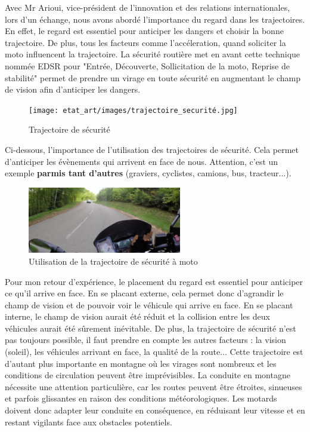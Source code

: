 Avec Mr Arioui, vice-président de l'innovation et des relations internationales, lors d'un échange, nous avons abordé l'importance du regard dans les trajectoires. En effet, le regard est essentiel pour anticiper les dangers et choisir la bonne trajectoire. De plus, tous les facteurs comme l'accéleration, quand soliciter la moto influencent la trajectoire. 
La sécurité routière\cite{trajectoire_securite} met en avant cette technique nommée EDSR pour "Entrée, Découverte, Sollicitation de la moto, Reprise de stabilité" permet de prendre un virage en toute sécurité en augmentant le champ de vision afin d'anticiper les dangers. 
\begin{figure}[H]
    \centering
    \texttt{[image: etat\_art/images/trajectoire\_securité.jpg]} 
    \caption{Trajectoire de sécurité}
\end{figure}
Ci-dessous, l'importance de l'utilisation des trajectoires de sécurité. Cela permet d'anticiper les évènements qui arrivent en face de nous. Attention, c'est un exemple \textbf{parmis tant d'autres} (graviers, cyclistes, camions, bus, tracteur...).
\begin{figure}[H]
    \centering
    \includegraphics[width=0.6\textwidth]{etat_art/images/morvan.png} 
    \caption{Utilisation de la trajectoire de sécurité à moto}
\end{figure}
Pour mon retour d'expérience, le placement du regard est essentiel pour anticiper ce qu'il arrive en face. En se placant externe, cela permet donc d'agrandir le champ de vision et de pouvoir voir le véhicule qui arrive en face. En se placant interne, le champ de vision aurait été réduit et la collision entre les deux véhicules aurait été sûrement inévitable. De plus, la trajectoire de sécurité n'est pas toujours possible, il faut prendre en compte les autres facteurs : la vision (soleil), les véhicules arrivant en face, la qualité de la route...
Cette trajectoire est d'autant plus importante en montagne où les virages sont nombreux et les conditions de circulation peuvent être imprévisibles. La conduite en montagne nécessite une attention particulière, car les routes peuvent être étroites, sinueuses et parfois glissantes en raison des conditions météorologiques. Les motards doivent donc adapter leur conduite en conséquence, en réduisant leur vitesse et en restant vigilants face aux obstacles potentiels.
